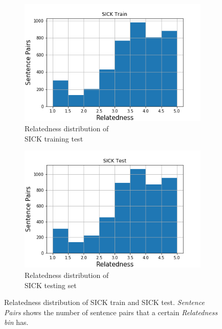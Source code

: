 \begin{enumerate}
\begin{figure}
	\captionsetup[subfigure]{justification=centering}
	\centering
	\begin{subfigure}[b]{.5\textwidth}
		\centering
		\includegraphics[width=\textwidth]{figures/semantic_textual_similarity/introduction/sick_train_relatedness_hist.png}
		\caption{Relatedness distribution of \\ SICK training test}
		\label{fig:sick_train_relatedness}
	\end{subfigure}%
	\begin{subfigure}[b]{.5\textwidth}
		\centering
		\includegraphics[width=\textwidth]{figures/semantic_textual_similarity/introduction/sick_test_relatedness_hist.png}
		\caption{Relatedness distribution of \\ SICK testing set}
		\label{fig:sick_test_relatedness}
	\end{subfigure}
	\caption[Relatedness distribution of SICK train and SICK test]{Relatedness distribution of SICK train and SICK test. \textit{Sentence Pairs} shows the number of sentence pairs that a certain \textit{Relatedness bin} has.}
	\label{fig:sick_relatedness}
\end{figure}


\end{enumerate}
